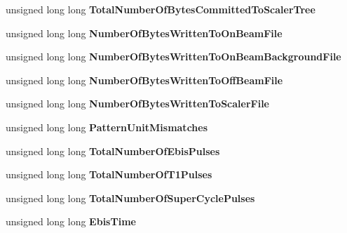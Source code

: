\begin{DoxyCompactItemize}
\item 
\mbox{\label{class_event_builder_ab65f8dae52a68a6c61bc1e1e1bae996b}} 
unsigned long long {\bfseries Total\+Number\+Of\+Bytes\+Committed\+To\+Scaler\+Tree}
\item 
\mbox{\label{class_event_builder_a638590f2a3784f3a7208a1862fdde67c}} 
unsigned long long {\bfseries Number\+Of\+Bytes\+Written\+To\+On\+Beam\+File}
\item 
\mbox{\label{class_event_builder_acbb871d8b83c7f693710129c03186b8d}} 
unsigned long long {\bfseries Number\+Of\+Bytes\+Written\+To\+On\+Beam\+Background\+File}
\item 
\mbox{\label{class_event_builder_aa9f7e586f862b480c5c66e09bd3e0385}} 
unsigned long long {\bfseries Number\+Of\+Bytes\+Written\+To\+Off\+Beam\+File}
\item 
\mbox{\label{class_event_builder_a5b85d0e5250b3cbb7a82525d77607558}} 
unsigned long long {\bfseries Number\+Of\+Bytes\+Written\+To\+Scaler\+File}
\item 
\mbox{\label{class_event_builder_a1b4b4ff6bca480c5002ff184cb46e077}} 
unsigned long long {\bfseries Pattern\+Unit\+Mismatches}
\item 
\mbox{\label{class_event_builder_a9693e4181b4ab9f86a96a2f2da27d077}} 
unsigned long long {\bfseries Total\+Number\+Of\+Ebis\+Pulses}
\item 
\mbox{\label{class_event_builder_ac03ad97da655cd74a68e443e3bae6704}} 
unsigned long long {\bfseries Total\+Number\+Of\+T1\+Pulses}
\item 
\mbox{\label{class_event_builder_acd34a967b6313c6a0e24c1d71bf4b035}} 
unsigned long long {\bfseries Total\+Number\+Of\+Super\+Cycle\+Pulses}
\item 
\mbox{\label{class_event_builder_a6ed13a2aacc3504863fe52ccc0f8ee7f}} 
unsigned long long {\bfseries Ebis\+Time}
\item 
\mbox{\label{class_event_builder_a728021fad9536a2e0b14e2a98bc8fc52}} 

\end{DoxyCompactItemize}
